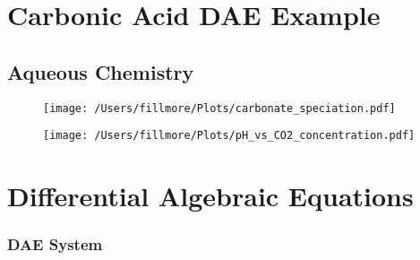\documentclass{beamer}
\begin{document}
\section{Carbonic Acid DAE Example}

\subsection{Aqueous Chemistry}

\begin{frame}

\end{frame}

\begin{frame}

\end{frame}

\begin{frame}

\end{frame}

\begin{frame}
\begin{figure}
\texttt{[image: /Users/fillmore/Plots/carbonate\_speciation.pdf]}
\end{figure}
\end{frame}

\begin{frame}
\begin{figure}
\texttt{[image: /Users/fillmore/Plots/pH\_vs\_CO2\_concentration.pdf]}
\end{figure}
\end{frame}

\section{Differential Algebraic Equations}
\frametitle{DAE System}

\begin{frame}

\end{frame}

\begin{frame}

\end{frame}

\begin{frame}

\end{frame}

\begin{frame}


\end{frame}
\end{document}
